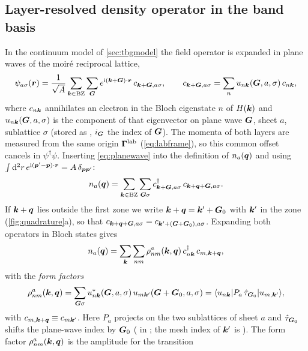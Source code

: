 \subsection{Layer-resolved density operator in the band basis}
\label{sec:formfactors}

In the continuum model of \cref{sec:tbgmodel} the field operator is expanded in plane waves of the moir\'e
reciprocal lattice,
\begin{equation}
\psi_{a\sigma}(\bm r)=\frac1{\sqrt A}\sum_{\bm k\in{\rm BZ}}\sum_{\bm G}e^{\mathrm i(\bm k+\bm G)\cdot\bm r}\,c_{\bm k+\bm G,a\sigma},
\qquad
c_{\bm k+\bm G,a\sigma}=\sum_n u_{n\bm k}(\bm G,a,\sigma)\,c_{n\bm k},
\label{eq:planewave}
\end{equation}
where $c_{n\bm k}$ annihilates an electron in the Bloch eigenstate $n$ of $H(\bm k)$ and $u_{n\bm k}(\bm G,a,\sigma)$ is the
component of that eigenvector on plane wave $\bm G$, sheet $a$, sublattice $\sigma$ (stored as
, $i_{\bm G}$ the index of $\bm G$). The momenta of both layers are measured from the same
origin $\bm\Gamma^{\rm lab}$ (\cref{eq:labframe}), so this common offset cancels in $\psi^\dagger\psi$. Inserting
\cref{eq:planewave} into the definition of $n_a(\bm q)$ and using $\int\mathrm d^2r\,e^{\mathrm i(\bm p'-\bm p)\cdot\bm r}=A\,\delta_{\bm p\bm p'}$:
\begin{equation}
n_a(\bm q)=\sum_{\bm k\in{\rm BZ}}\sum_{\bm G\sigma}c^\dagger_{\bm k+\bm G,a\sigma}\,c_{\bm k+\bm q+\bm G,a\sigma} .
\end{equation}
If $\bm k+\bm q$ lies outside the first zone we write $\bm k+\bm q=\bm k'+\bm G_0$ with $\bm k'$ in the zone
(\cref{fig:quadrature}a), so that $c_{\bm k+\bm q+\bm G,a\sigma}=c_{\bm k'+(\bm G+\bm G_0),a\sigma}$. Expanding both operators in
Bloch states gives
\begin{equation}
n_a(\bm q)=\sum_{\bm k}\sum_{nm}\rho^a_{nm}(\bm k,\bm q)\,c^\dagger_{n\bm k}\,c_{m,\bm k+\bm q},
\label{eq:nq_band}
\end{equation}
with the \emph{form factors}
\begin{equation}
\rho^a_{nm}(\bm k,\bm q)=\sum_{\bm G\sigma}u^*_{n\bm k}(\bm G,a,\sigma)\,u_{m\bm k'}(\bm G+\bm G_0,a,\sigma)
=\langle u_{n\bm k}|P_a\,\hat\tau_{\bm G_0}|u_{m,\bm k'}\rangle ,
\label{eq:formfactor}
\end{equation}
with $c_{m,\bm k+\bm q}\equiv c_{m\bm k'}$. Here $P_a$ projects on the two sublattices of sheet $a$ and $\hat\tau_{\bm G_0}$
shifts the plane-wave index by $\bm G_0$ ( in ; the mesh index of
$\bm k'$ is ). The form factor $\rho^a_{nm}(\bm k,\bm q)$ is the amplitude for the transition
